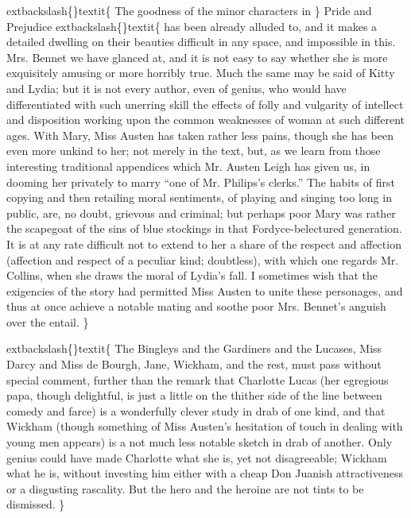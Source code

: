 \documentclass[10pt]{book}
\begin{document}
	extbackslash\{\}textit\{
    The goodness of the minor characters in
   \}
   Pride and Prejudice
   	extbackslash\{\}textit\{
    has been
already alluded to, and it makes a detailed dwelling on their beauties
difficult in any space, and impossible in this. Mrs. Bennet we have
glanced at, and it is not easy to say whether she is more exquisitely
amusing or more horribly true. Much the same may be said of Kitty and
Lydia; but it is not every author, even of genius, who would have
differentiated with such unerring skill the effects of folly and
vulgarity of intellect and disposition working upon the common
weaknesses of woman at such different ages. With Mary, Miss Austen has
taken rather less pains, though she has been even more unkind to her;
not merely in the text, but, as we learn from those interesting
traditional appendices which Mr. Austen Leigh has given us, in dooming
her privately to marry “one of Mr. Philips’s clerks.” The habits of
first copying and then retailing moral sentiments, of playing and
singing too long in public, are, no doubt, grievous and criminal; but
perhaps poor Mary was rather the scapegoat of the sins of blue stockings
in that Fordyce-belectured generation. It is at any rate difficult not
to extend to her a share of the respect and affection (affection and
respect of a peculiar kind; doubtless), with which one regards Mr.
Collins, when she draws the moral of Lydia’s fall. I
    sometimes wish
that the exigencies of the story had permitted Miss Austen to unite
these personages, and thus at once achieve a notable mating and soothe
poor Mrs. Bennet’s anguish over the entail.
   \}

	extbackslash\{\}textit\{
    The Bingleys and the Gardiners and the Lucases, Miss Darcy and Miss de
Bourgh, Jane, Wickham, and the rest, must pass without special comment,
further than the remark that Charlotte Lucas (her egregious papa, though
delightful, is just a little on the thither side of the line between
comedy and farce) is a wonderfully clever study in drab of one kind, and
that Wickham (though something of Miss Austen’s hesitation of touch in
dealing with young men appears) is a not much less notable sketch in
drab of another. Only genius could have made Charlotte what she is, yet
not disagreeable; Wickham what he is, without investing him either with
a cheap Don Juanish attractiveness or a disgusting rascality. But the
hero and the heroine are not tints to be dismissed.
   \}
\end{document}
